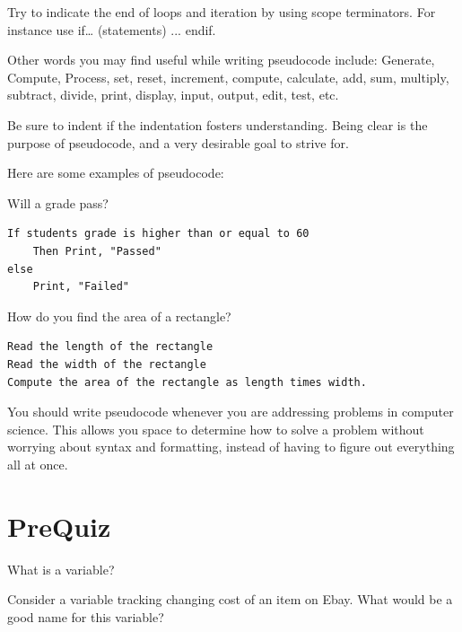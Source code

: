 Try to indicate the end of loops and iteration by using scope terminators.
For instance use if… (statements) ... endif.

Other words you may find useful while writing pseudocode include: Generate, Compute, Process, set, reset, increment, compute, calculate, add, sum, multiply, subtract, divide, print, display, input, output, edit, test, etc.

Be sure to indent if the indentation fosters understanding. Being clear is the purpose of pseudocode, and a very desirable goal to strive for.

Here are some examples of pseudocode:

\begin{example} Will a grade pass?
\begin{verbatim}
If students grade is higher than or equal to 60
	Then Print, "Passed"
else
	Print, "Failed"
\end{verbatim}
    
\end{example}

\begin{example} How do you find the area of a rectangle?
\begin{verbatim}
Read the length of the rectangle
Read the width of the rectangle
Compute the area of the rectangle as length times width.
\end{verbatim}
    
\end{example}

You should write pseudocode whenever you are addressing problems in computer science. This allows you space to determine how to solve a problem without worrying about syntax and formatting, instead of having to figure out everything all at once. 

\section{PreQuiz}
\begin{problem}
    What is a variable?
\end{problem}

\vspace{2cm}

\begin{problem}
    Consider a variable tracking changing cost of an item on Ebay. What would be a good name for this variable?
\end{problem}

\vspace{1.5cm}

